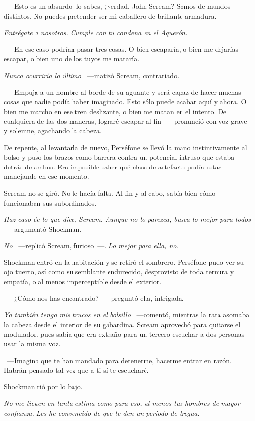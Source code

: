 ~---Esto es un absurdo, lo sabes, ¿verdad, John Scream? Somos de mundos distintos. No puedes pretender ser mi caballero de brillante armadura.

\emph{Entrégate a nosotros. Cumple con tu condena en el Aquerón.}

~---En ese caso podrían pasar tres cosas. O bien escaparía, o bien me dejarías escapar, o bien uno de los tuyos me mataría.

\emph{Nunca ocurriría lo último} ~---matizó Scream, contrariado.

~---Empuja a un hombre al borde de su aguante y será capaz de hacer muchas cosas que nadie podía haber imaginado. Esto sólo puede acabar aquí y ahora. O bien me marcho en ese tren deslizante, o bien me matan en el intento. De cualquiera de las dos maneras, lograré escapar al fin ~---pronunció con voz grave y solemne, agachando la cabeza.

De repente, al levantarla de nuevo, Perséfone se llevó la mano instintivamente al bolso y puso los brazos como barrera contra un potencial intruso que estaba detrás de ambos. Era imposible saber qué clase de artefacto podía estar manejando en ese momento.

Scream no se giró. No le hacía falta. Al fin y al cabo, sabía bien cómo funcionaban sus subordinados.

\emph{Haz caso de lo que dice, Scream. Aunque no lo parezca, busca lo mejor para todos} ~---argumentó Shockman.

\emph{No} ~---replicó Scream, furioso~---. \emph{Lo mejor para ella, no.}

Shockman entró en la habitación y se retiró el sombrero. Perséfone pudo ver su ojo tuerto, así como su semblante endurecido, desprovisto de toda ternura y empatía, o al menos imperceptible desde el exterior.

~---¿Cómo nos has encontrado? ~---preguntó ella, intrigada.

\emph{Yo también tengo mis trucos en el bolsillo} ~---comentó, mientras la rata asomaba la cabeza desde el interior de su gabardina. Scream aprovechó para quitarse el modulador, pues sabía que era extraño para un tercero escuchar a dos personas usar la misma voz.

~---Imagino que te han mandado para detenerme, hacerme entrar en razón. Habrán pensado tal vez que a ti sí te escucharé.

Shockman rió por lo bajo.

\emph{No me tienen en tanta estima como para eso, al menos tus hombres de mayor confianza. Les he convencido de que te den un periodo de tregua.}

